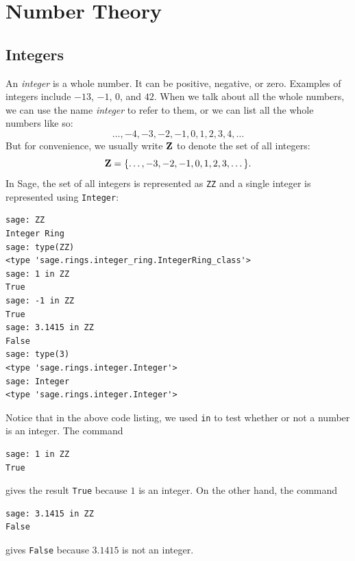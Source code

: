 
\chapter{Number Theory}



\section{Integers}

An \emph{integer} is a whole number. It can be
positive, negative, or zero. Examples of integers include $-13$, $-1$,
$0$, and $42$. When we talk about all the whole numbers, we can use
the name \emph{integer} to refer to them, or we can
list all the whole numbers like so:
\[
\dots, -4, -3, -2, -1, 0, 1, 2, 3, 4, \dots
\]
But for convenience, we usually write $\ZZ$\index{$\ZZ$} to denote the
set of all integers:
\[
\mathbf{Z}
=
\{\dots, -3, -2, -1, 0, 1, 2, 3, \dots\}.
\]
In Sage, the set of all integers is represented as \verb!ZZ! and a
single integer is represented using \verb!Integer!:
%
\begin{lstlisting}
sage: ZZ
Integer Ring
sage: type(ZZ)
<type 'sage.rings.integer_ring.IntegerRing_class'>
sage: 1 in ZZ
True
sage: -1 in ZZ
True
sage: 3.1415 in ZZ
False
sage: type(3)
<type 'sage.rings.integer.Integer'>
sage: Integer
<type 'sage.rings.integer.Integer'>
\end{lstlisting}
%
Notice that in the above code listing, we used \verb!in! to test
whether or not a number is an integer. The command
%
\begin{lstlisting}
sage: 1 in ZZ
True
\end{lstlisting}
%
gives the result \verb!True! because $1$ is an integer. On the other
hand, the command
%
\begin{lstlisting}
sage: 3.1415 in ZZ
False
\end{lstlisting}
%
gives \verb!False! because $3.1415$ is not an integer.


